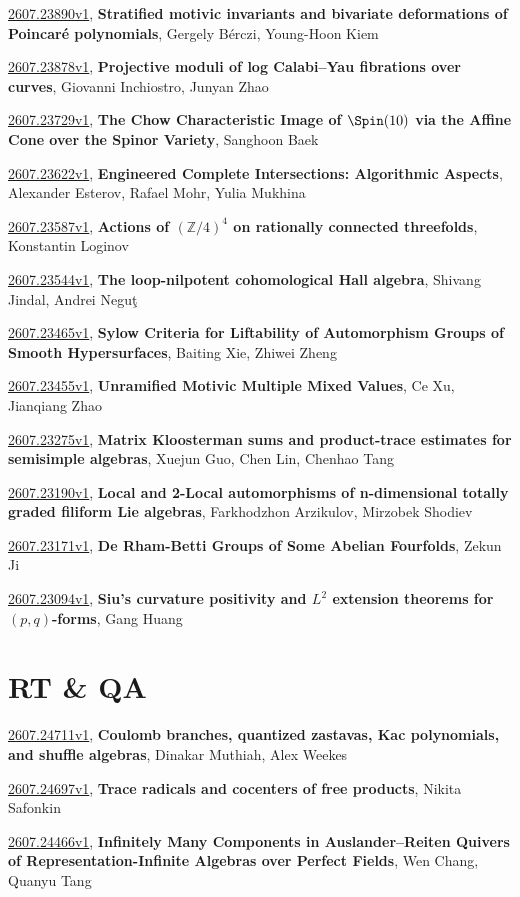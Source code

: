 \documentclass[9pt, a4paper]{article}
\theoremstyle{plain}
\theoremstyle{definition}
\theoremstyle{remark}
\newcommand{\arxiv}[3]{\href{https://arxiv.org/abs/#1}{#1}, \textbf{\textcolor{arxivblue}{#2}}, #3}
\begin{document}
\arxiv{2607.23890v1}{Stratified motivic invariants and bivariate deformations of Poincaré polynomials}{Gergely Bérczi, Young-Hoon Kiem}

\arxiv{2607.23878v1}{Projective moduli of log Calabi--Yau fibrations over curves}{Giovanni Inchiostro, Junyan Zhao}

\arxiv{2607.23729v1}{The Chow Characteristic Image of \(\Spin(10)\) via the Affine Cone over the Spinor Variety}{Sanghoon Baek}

\arxiv{2607.23622v1}{Engineered Complete Intersections: Algorithmic Aspects}{Alexander Esterov, Rafael Mohr, Yulia Mukhina}

\arxiv{2607.23587v1}{Actions of $(\mathbb{Z}/4)^4$ on rationally connected threefolds}{Konstantin Loginov}

\arxiv{2607.23544v1}{The loop-nilpotent cohomological Hall algebra}{Shivang Jindal, Andrei Neguţ}

\arxiv{2607.23465v1}{Sylow Criteria for Liftability of Automorphism Groups of Smooth Hypersurfaces}{Baiting Xie, Zhiwei Zheng}

\arxiv{2607.23455v1}{Unramified Motivic Multiple Mixed Values}{Ce Xu, Jianqiang Zhao}

\arxiv{2607.23275v1}{Matrix Kloosterman sums and product-trace estimates for semisimple algebras}{Xuejun Guo, Chen Lin, Chenhao Tang}

\arxiv{2607.23190v1}{Local and 2-Local automorphisms of n-dimensional totally graded filiform Lie algebras}{Farkhodzhon Arzikulov, Mirzobek Shodiev}

\arxiv{2607.23171v1}{De Rham-Betti Groups of Some Abelian Fourfolds}{Zekun Ji}

\arxiv{2607.23094v1}{Siu's curvature positivity and $L^2$ extension theorems for $(p,q)$-forms}{Gang Huang}


\section{RT \& QA}
\arxiv{2607.24711v1}{Coulomb branches, quantized zastavas, Kac polynomials, and shuffle algebras}{Dinakar Muthiah, Alex Weekes}

\arxiv{2607.24697v1}{Trace radicals and cocenters of free products}{Nikita Safonkin}

\arxiv{2607.24466v1}{Infinitely Many Components in Auslander--Reiten Quivers of Representation-Infinite Algebras over Perfect Fields}{Wen Chang, Quanyu Tang}
\end{document}
